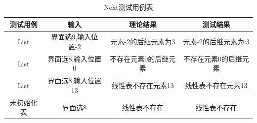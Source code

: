 \documentclass[supercite]{HustGraduPaper}
\theoremstyle{definition}
\begin{document}
\begin{enumerate}
\begin{table}[htb]
		      \begin{center}
			      \setlength{\tabcolsep}{2.0mm}
			      \caption{Next测试用例表}
			      \label{table8}
			      \begin{tabular}{|c|c|c|c|}
				      \hline
				      测试用例   & 输入               & 理论结果              & 测试结果              \\
				      \hline
				      \hline
				      List       & 界面选9,输入位置-2 & 元素-2的后继元素为3   & 元素-2的后继元素为:3  \\
				      \hline
				      List       & 界面选8,输入位置0  & 不存在元素0的后继元素 & 不存在元素0的后继元素 \\
				      \hline
				      List       & 界面选8,输入位置13 & 线性表不存在元素13    & 线性表不存在元素13    \\
				      \hline
				      未初始化表 & 界面选8            & 线性表不存在          & 线性表不存在          \\
				      \hline
			      \end{tabular}
		      \end{center}
	      \end{table}
	      \begin{figure}[htb]
		      \centering
		      \quad
		      \quad
		      \\

\end{figure}
\end{enumerate}
\end{document}
